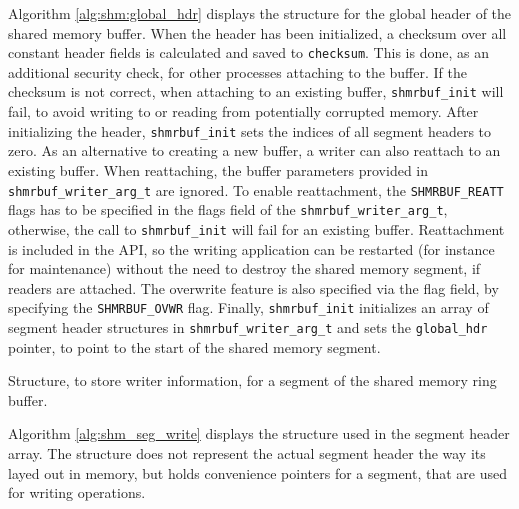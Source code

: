 Algorithm \ref{alg:shm:global_hdr} displays the structure for the global header of the shared memory buffer. When the header has been initialized,
a checksum over all constant header fields is calculated and saved to \texttt{checksum}. This is done, as an additional security check, for other processes attaching to the buffer. 
If the checksum is not correct, when attaching to an existing buffer, \texttt{shmrbuf\_init} will fail, to avoid writing to or reading from potentially corrupted memory. After initializing the header,
\texttt{shmrbuf\_init} sets the indices of all segment headers to zero. As an alternative to creating a new buffer,
a writer can also reattach to an existing buffer. When reattaching, the buffer parameters provided in \texttt{shmrbuf\_writer\_arg\_t} are ignored. To enable reattachment, the \texttt{SHMRBUF\_REATT} flags has to be specified in the flags field of the \texttt{shmrbuf\_writer\_arg\_t}, otherwise, the call   
to \texttt{shmrbuf\_init} will fail for an existing buffer. Reattachment is included in the API, so the writing application can be restarted (for instance for maintenance) without the need to
destroy the shared memory segment, if readers are attached. The overwrite feature is also specified via the flag field, by specifying the \texttt{SHMRBUF\_OVWR} flag.
Finally, \texttt{shmrbuf\_init} initializes an array of segment header structures in \texttt{shmrbuf\_writer\_arg\_t} and sets the \texttt{global\_hdr} pointer, to point to the start of the shared memory segment.

\begin{algorithm}[h!]
    
    \caption[Shared Memory Ringbuffer: Writer Segment Header]{Structure, to store writer information, for a segment of the shared memory ring buffer.}
    \label{alg:shm_seg_write}
\end{algorithm}
Algorithm \ref{alg:shm_seg_write} displays the structure used in the segment header array. The structure does not represent the actual segment header the way its layed out in memory, but holds convenience pointers for a segment, that are used for writing operations.   
   
